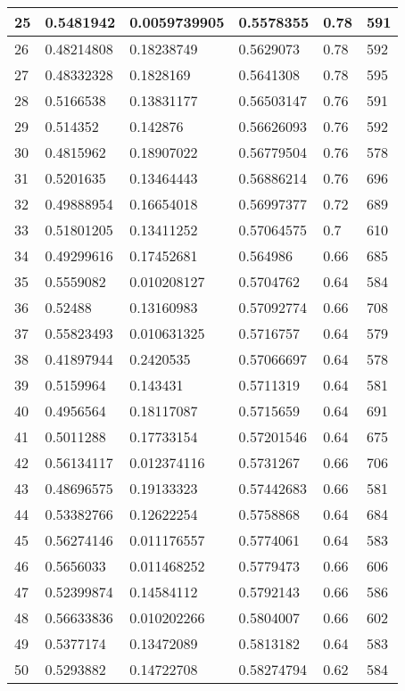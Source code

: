 \begin{longtable}{|l|l|l|l|l|l|}
25 & 0.5481942 & 0.0059739905 & 0.5578355 & 0.78 & 591 \\ \hline 
26 & 0.48214808 & 0.18238749 & 0.5629073 & 0.78 & 592 \\ \hline 
27 & 0.48332328 & 0.1828169 & 0.5641308 & 0.78 & 595 \\ \hline 
28 & 0.5166538 & 0.13831177 & 0.56503147 & 0.76 & 591 \\ \hline 
29 & 0.514352 & 0.142876 & 0.56626093 & 0.76 & 592 \\ \hline 
30 & 0.4815962 & 0.18907022 & 0.56779504 & 0.76 & 578 \\ \hline 
31 & 0.5201635 & 0.13464443 & 0.56886214 & 0.76 & 696 \\ \hline 
32 & 0.49888954 & 0.16654018 & 0.56997377 & 0.72 & 689 \\ \hline 
33 & 0.51801205 & 0.13411252 & 0.57064575 & 0.7 & 610 \\ \hline 
34 & 0.49299616 & 0.17452681 & 0.564986 & 0.66 & 685 \\ \hline 
35 & 0.5559082 & 0.010208127 & 0.5704762 & 0.64 & 584 \\ \hline 
36 & 0.52488 & 0.13160983 & 0.57092774 & 0.66 & 708 \\ \hline 
37 & 0.55823493 & 0.010631325 & 0.5716757 & 0.64 & 579 \\ \hline 
38 & 0.41897944 & 0.2420535 & 0.57066697 & 0.64 & 578 \\ \hline 
39 & 0.5159964 & 0.143431 & 0.5711319 & 0.64 & 581 \\ \hline 
40 & 0.4956564 & 0.18117087 & 0.5715659 & 0.64 & 691 \\ \hline 
41 & 0.5011288 & 0.17733154 & 0.57201546 & 0.64 & 675 \\ \hline 
42 & 0.56134117 & 0.012374116 & 0.5731267 & 0.66 & 706 \\ \hline 
43 & 0.48696575 & 0.19133323 & 0.57442683 & 0.66 & 581 \\ \hline 
44 & 0.53382766 & 0.12622254 & 0.5758868 & 0.64 & 684 \\ \hline 
45 & 0.56274146 & 0.011176557 & 0.5774061 & 0.64 & 583 \\ \hline 
46 & 0.5656033 & 0.011468252 & 0.5779473 & 0.66 & 606 \\ \hline 
47 & 0.52399874 & 0.14584112 & 0.5792143 & 0.66 & 586 \\ \hline 
48 & 0.56633836 & 0.010202266 & 0.5804007 & 0.66 & 602 \\ \hline 
49 & 0.5377174 & 0.13472089 & 0.5813182 & 0.64 & 583 \\ \hline 
50 & 0.5293882 & 0.14722708 & 0.58274794 & 0.62 & 584 \\ \hline 
\end{longtable}